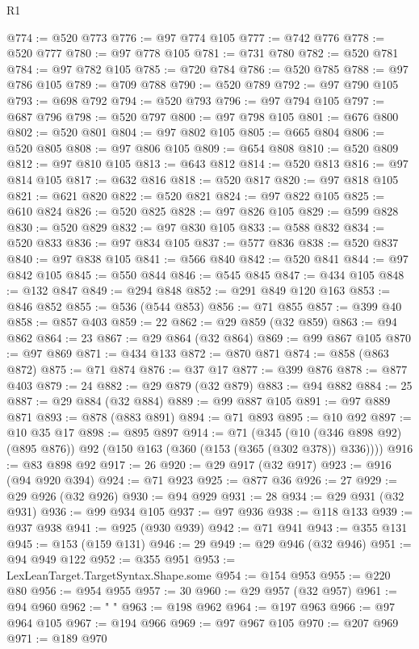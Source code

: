 \begin{lexlean}{R1}
\begin{coremodule}
{{{{{{{{{{{{{{{{{{{{{{{{{{{{{{{{{{{{{{{{{{{{{{{{{{{{{{{{{{{{{{{{{{{{{{{{{{{{{{{{{{{{{{{{{{{{{{{{{{{{{{{{{{{{{{{{{{{{{{{{{{{{{{{{{{{{{{{{{{{{{{{{{{{{{{{{{{{{{{{{{{{{{{{{{{{{{{{{{{{{{{{{{{@774 := @520 @773
@776 := @97 @774 @105
@777 := @742 @776
@778 := @520 @777
@780 := @97 @778 @105
@781 := @731 @780
@782 := @520 @781
@784 := @97 @782 @105
@785 := @720 @784
@786 := @520 @785
@788 := @97 @786 @105
@789 := @709 @788
@790 := @520 @789
@792 := @97 @790 @105
@793 := @698 @792
@794 := @520 @793
@796 := @97 @794 @105
@797 := @687 @796
@798 := @520 @797
@800 := @97 @798 @105
@801 := @676 @800
@802 := @520 @801
@804 := @97 @802 @105
@805 := @665 @804
@806 := @520 @805
@808 := @97 @806 @105
@809 := @654 @808
@810 := @520 @809
@812 := @97 @810 @105
@813 := @643 @812
@814 := @520 @813
@816 := @97 @814 @105
@817 := @632 @816
@818 := @520 @817
@820 := @97 @818 @105
@821 := @621 @820
@822 := @520 @821
@824 := @97 @822 @105
@825 := @610 @824
@826 := @520 @825
@828 := @97 @826 @105
@829 := @599 @828
@830 := @520 @829
@832 := @97 @830 @105
@833 := @588 @832
@834 := @520 @833
@836 := @97 @834 @105
@837 := @577 @836
@838 := @520 @837
@840 := @97 @838 @105
@841 := @566 @840
@842 := @520 @841
@844 := @97 @842 @105
@845 := @550 @844
@846 := @545 @845
@847 := @434 @105
@848 := @132 @847
@849 := @294 @848
@852 := @291 @849 @120 @163
@853 := @846 @852
@855 := @536 (@544 @853)
@856 := @71 @855
@857 := @399 @40
@858 := @857 @403
@859 := 22
@862 := @29 @859 (@32 @859)
@863 := @94 @862
@864 := 23
@867 := @29 @864 (@32 @864)
@869 := @99 @867 @105
@870 := @97 @869
@871 := @434 @133
@872 := @870 @871
@874 := @858 (@863 @872)
@875 := @71 @874
@876 := @37 @17
@877 := @399 @876
@878 := @877 @403
@879 := 24
@882 := @29 @879 (@32 @879)
@883 := @94 @882
@884 := 25
@887 := @29 @884 (@32 @884)
@889 := @99 @887 @105
@891 := @97 @889 @871
@893 := @878 (@883 @891)
@894 := @71 @893
@895 := @10 @92
@897 := @10 @35 @17
@898 := @895 @897
@914 := @71
    (@345 (@10 (@346 @898 @92) (@895 @876)) @92 (@150 @163 (@360 (@153 (@365 (@302 @378)) @336))))
@916 := @83 @898 @92
@917 := 26
@920 := @29 @917 (@32 @917)
@923 := @916 (@94 @920 @394)
@924 := @71 @923
@925 := @877 @36
@926 := 27
@929 := @29 @926 (@32 @926)
@930 := @94 @929
@931 := 28
@934 := @29 @931 (@32 @931)
@936 := @99 @934 @105
@937 := @97 @936
@938 := @118 @133
@939 := @937 @938
@941 := @925 (@930 @939)
@942 := @71 @941
@943 := @355 @131
@945 := @153 (@159 @131)
@946 := 29
@949 := @29 @946 (@32 @946)
@951 := @94 @949 @122
@952 := @355 @951
@953 := LexLeanTarget.TargetSyntax.Shape.some
@954 := @154 @953
@955 := @220 @80
@956 := @954 @955
@957 := 30
@960 := @29 @957 (@32 @957)
@961 := @94 @960
@962 := " "
@963 := @198 @962
@964 := @197 @963
@966 := @97 @964 @105
@967 := @194 @966
@969 := @97 @967 @105
@970 := @207 @969
@971 := @189 @970
}}}}}}}}}}}}}}}}}}}}}}}}}}}}}}}}}}}}}}}}}}}}}}}}}}}}}}}}}}}}}}}}}}}}}}}}}}}}}}}}}}}}}}}}}}}}}}}}}}}}}}}}}}}}}}}}}}}}}}}}}}}}}}}}}}}}}}}}}}}}}}}}}}}}}}}}}}}}}}}}}}}}}}}}}}}}}}}}}}}}}}}}}}
\end{coremodule}
\end{lexlean}
